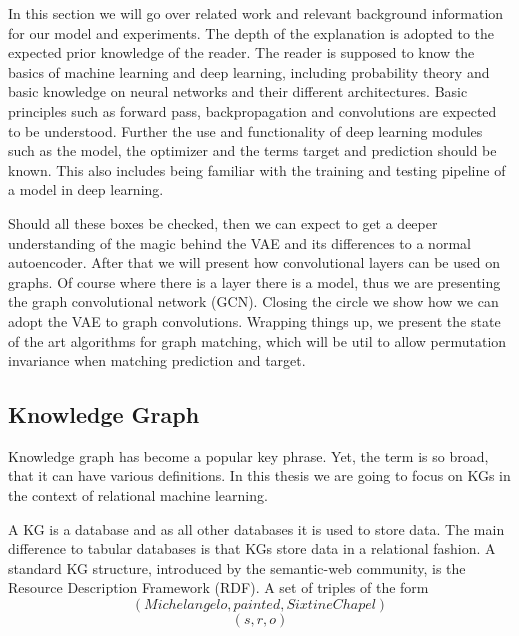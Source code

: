 In this section we will go over related work and relevant background information for our model and experiments. The depth of the explanation is adopted to the expected prior knowledge of the reader. The reader is supposed to know the basics of machine learning and deep learning, including probability theory and basic knowledge on neural networks and their different architectures. Basic principles such as forward pass, backpropagation and convolutions are expected to be understood. Further the use and functionality of deep learning modules such as the model, the optimizer and the terms target and prediction should be known. This also includes being familiar with the training and testing pipeline of a model in deep learning.

Should all these boxes be checked, then we can expect to get a deeper understanding of the magic behind the VAE and its differences to a normal autoencoder. After that we will present how convolutional layers can be used on graphs. Of course where there is a layer there is a model, thus we are presenting the graph convolutional network (GCN). Closing the circle we show how we can adopt the VAE to graph convolutions. Wrapping things up, we present the state of the art algorithms for graph matching, which will be util to allow permutation invariance when matching prediction and target.  


\subsection{Knowledge Graph}

Knowledge graph has become a popular key phrase. Yet, the term is so broad, that it can have various definitions. In this thesis we are going to focus on KGs in the context of relational machine learning.

A KG is a database and as all other databases it is used to store data. The main difference to tabular databases is that KGs store data in a relational fashion. A standard KG structure, introduced by the semantic-web community, is the Resource
Description Framework (RDF). 
A set of triples of the form
\begin{equation}
    (Michelangelo,  painted,    Sixtine Chapel)
\end{equation}
\begin{equation}
    (s, r,  o)
\end{equation}
 
